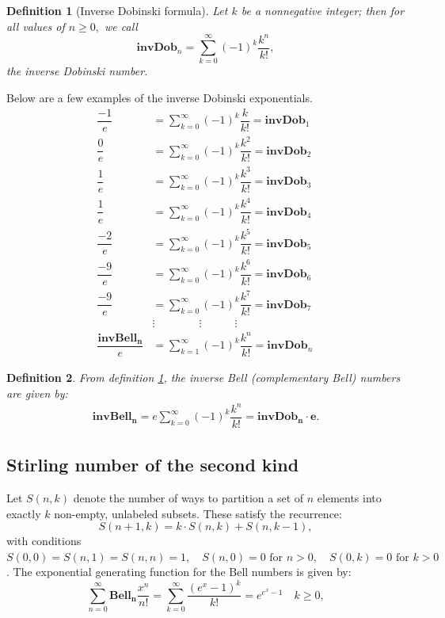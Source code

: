\documentclass[pdflatex,sn-mathphys-num]{sn-jnl}%
\newcommand\scalemath[2]{\scalebox{#1}{\mbox{\ensuremath{\displaystyle #2}}}}
\newtheorem{definition}{Definition}
\theoremstyle{thmstyleone}%
\theoremstyle{thmstyletwo}%
\theoremstyle{thmstylethree}%
\begin{document}
\begin{definition}[Inverse Dobinski formula]\label{id}
    Let $k$ be a nonnegative integer; then for all values of $n\geq 0,$ we call 
    $$\mathbf{invDob}_n=\sum_{k=0}^{\infty}(-1)^k\dfrac{k^n}{k!},$$
    the inverse Dobinski number.
\end{definition}
Below are a few examples of the inverse Dobinski exponentials.
\begin{align*}
    \dfrac{-1}{e}&=\sum_{k=0}^{\infty}(-1)^k\dfrac{k}{k!}=\mathbf{invDob}_1\\ \nonumber
   \dfrac{0}{e}&= \sum_{k=0}^{\infty}(-1)^k\dfrac{k^2}{k!}=\mathbf{invDob}_2\\ \nonumber
    \dfrac{1}{e}&= \sum_{k=0}^{\infty}(-1)^k\dfrac{k^3}{k!}=\mathbf{invDob}_3\\ \nonumber
    \dfrac{1}{e}&= \sum_{k=0}^{\infty}(-1)^k\dfrac{k^4}{k!}=\mathbf{invDob}_4\\ \nonumber
    \dfrac{-2}{e}&=\sum_{k=0}^{\infty}(-1)^k\dfrac{k^5}{k!}=\mathbf{invDob}_5\\ \nonumber
   \dfrac{-9}{e}&=\sum_{k=0}^{\infty}(-1)^k\dfrac{k^6}{k!}=\mathbf{invDob}_6\\ \nonumber
    \dfrac{-9}{e}&= \sum_{k=0}^{\infty}(-1)^k\dfrac{k^7}{k!}=\mathbf{invDob}_7 \\ \nonumber
     &\vdots \quad \quad \quad \quad \vdots \quad \quad \quad\vdots \quad \quad \quad \quad \quad \quad \quad \\
    \dfrac{\mathbf{invBell_{n}}}{e}&= \sum_{k=1}^{\infty}(-1)^k\dfrac{k^n}{k!}=\mathbf{invDob}_{n}
\end{align*}

\begin{definition}\label{invBelo}\cite{amdeberhan2013complementary, rao1969numbers, wilf2005generatingfunctionology}
From definition \ref{id}, the inverse Bell (complementary Bell) numbers are given by:
\begin{align}
      \mathbf{invBell_{n}}=e\sum_{k=0}^{\infty}(-1)^k \dfrac{k^n}{k!}=\mathbf{invDob_{n}\cdotp e}.
\end{align}
\end{definition}

\subsection{Stirling number of the second kind}\label{sec}
Let \( S(n, k) \) denote the number of ways to partition a set of \( n \) elements into exactly \( k \) non-empty, unlabeled subsets. These satisfy the recurrence:
\[
S(n+1, k) = k \cdot S(n, k) + S(n, k-1),
\]
with conditions
$S(0, 0) =S(n, 1) =S(n, n) = 1, \quad S(n, 0) = 0 \text{ for } n > 0, \quad S(0, k) = 0 \text{ for } k > 0$ \cite{riordan2014introduction, comtet2012advanced}.
The exponential generating function for the Bell numbers is given by:
\[
 \sum_{n=0}^{\infty} \mathbf{Bell_n} \frac{x^n}{n!} =\sum_{k=0}^{\infty}\dfrac{(e^x - 1)^k}{k!}= e^{e^x - 1} \quad k\geq 0,
\]
\end{document}
